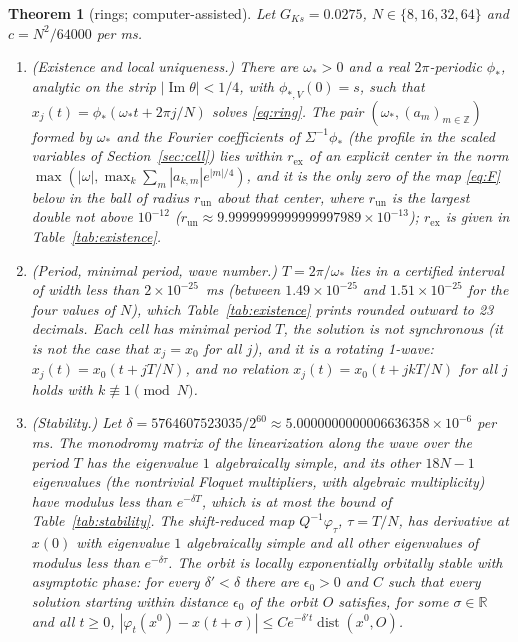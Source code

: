 \documentclass[11pt]{article}
\newtheorem{theorem}{Theorem}
\theoremstyle{definition}
\newcommand{\R}{\mathbb{R}}
\newcommand{\Z}{\mathbb{Z}}
\newcommand{\im}{\operatorname{Im}}
\begin{document}
\begin{theorem}[rings; computer-assisted]\label{thm:ring}
Let $G_{Ks} = 0.0275$, $N \in \{8, 16, 32, 64\}$ and $c = N^2/64000$ per ms.
\begin{enumerate}
\item[(a)] (Existence and local uniqueness.) There are $\omega_* > 0$ and a real $2\pi$-periodic $\phi_*$, analytic on the strip $|\im\theta| < 1/4$, with $\phi_{*,V}(0) = s$, such that $x_j(t) = \phi_*(\omega_* t + 2\pi j/N)$ solves \eqref{eq:ring}. The pair $(\omega_*, (a_m)_{m\in\Z})$ formed by $\omega_*$ and the Fourier coefficients of $\Sigma^{-1}\phi_*$ (the profile in the scaled variables of Section~\ref{sec:cell}) lies within $r_{\mathrm{ex}}$ of an explicit center in the norm $\max(|\omega|, \max_k \sum_m |a_{k,m}| e^{|m|/4})$, and it is the only zero of the map \eqref{eq:F} below in the ball of radius $r_{\mathrm{un}}$ about that center, where $r_{\mathrm{un}}$ is the largest double not above $10^{-12}$ ($r_{\mathrm{un}} \approx 9.9999999999999997989 \times 10^{-13}$); $r_{\mathrm{ex}}$ is given in Table~\ref{tab:existence}.
\item[(b)] (Period, minimal period, wave number.) $T = 2\pi/\omega_*$ lies in a certified interval of width less than $2 \times 10^{-25}$~ms (between $1.49 \times 10^{-25}$ and $1.51 \times 10^{-25}$ for the four values of $N$), which Table~\ref{tab:existence} prints rounded outward to 23 decimals. Each cell has minimal period $T$, the solution is not synchronous (it is not the case that $x_j = x_0$ for all $j$), and it is a rotating 1-wave: $x_j(t) = x_0(t + jT/N)$, and no relation $x_j(t) = x_0(t + jkT/N)$ for all $j$ holds with $k \not\equiv 1 \pmod N$.
\item[(c)] (Stability.) Let $\delta = 5764607523035/2^{60} \approx 5.0000000000006636358 \times 10^{-6}$ per ms. The monodromy matrix of the linearization along the wave over the period $T$ has the eigenvalue $1$ algebraically simple, and its other $18N - 1$ eigenvalues (the nontrivial Floquet multipliers, with algebraic multiplicity) have modulus less than $e^{-\delta T}$, which is at most the bound of Table~\ref{tab:stability}. The shift-reduced map $Q^{-1}\varphi_{\tau}$, $\tau = T/N$, has derivative at $x(0)$ with eigenvalue $1$ algebraically simple and all other eigenvalues of modulus less than $e^{-\delta\tau}$. The orbit is locally exponentially orbitally stable with asymptotic phase: for every $\delta' < \delta$ there are $\epsilon_0 > 0$ and $C$ such that every solution starting within distance $\epsilon_0$ of the orbit $O$ satisfies, for some $\sigma \in \R$ and all $t \ge 0$, $|\varphi_t(x^0) - x(t + \sigma)| \le C e^{-\delta' t} \operatorname{dist}(x^0, O)$.
\end{enumerate}
\end{theorem}
\end{document}
